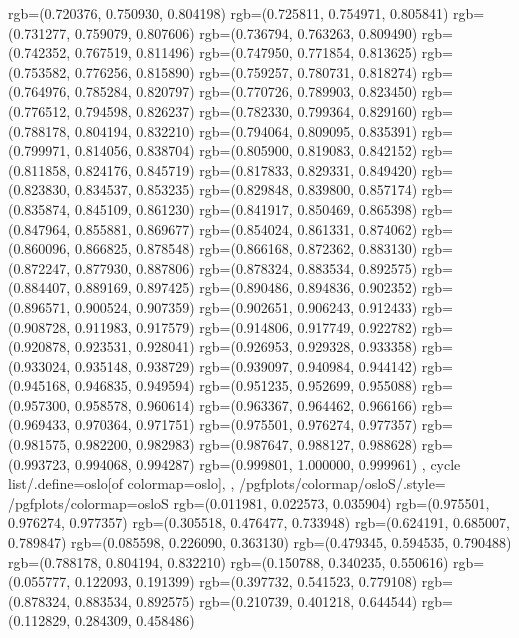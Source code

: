 {{{					rgb=(0.720376, 0.750930, 0.804198)
					rgb=(0.725811, 0.754971, 0.805841)
					rgb=(0.731277, 0.759079, 0.807606)
					rgb=(0.736794, 0.763263, 0.809490)
					rgb=(0.742352, 0.767519, 0.811496)
					rgb=(0.747950, 0.771854, 0.813625)
					rgb=(0.753582, 0.776256, 0.815890)
					rgb=(0.759257, 0.780731, 0.818274)
					rgb=(0.764976, 0.785284, 0.820797)
					rgb=(0.770726, 0.789903, 0.823450)
					rgb=(0.776512, 0.794598, 0.826237)
					rgb=(0.782330, 0.799364, 0.829160)
					rgb=(0.788178, 0.804194, 0.832210)
					rgb=(0.794064, 0.809095, 0.835391)
					rgb=(0.799971, 0.814056, 0.838704)
					rgb=(0.805900, 0.819083, 0.842152)
					rgb=(0.811858, 0.824176, 0.845719)
					rgb=(0.817833, 0.829331, 0.849420)
					rgb=(0.823830, 0.834537, 0.853235)
					rgb=(0.829848, 0.839800, 0.857174)
					rgb=(0.835874, 0.845109, 0.861230)
					rgb=(0.841917, 0.850469, 0.865398)
					rgb=(0.847964, 0.855881, 0.869677)
					rgb=(0.854024, 0.861331, 0.874062)
					rgb=(0.860096, 0.866825, 0.878548)
					rgb=(0.866168, 0.872362, 0.883130)
					rgb=(0.872247, 0.877930, 0.887806)
					rgb=(0.878324, 0.883534, 0.892575)
					rgb=(0.884407, 0.889169, 0.897425)
					rgb=(0.890486, 0.894836, 0.902352)
					rgb=(0.896571, 0.900524, 0.907359)
					rgb=(0.902651, 0.906243, 0.912433)
					rgb=(0.908728, 0.911983, 0.917579)
					rgb=(0.914806, 0.917749, 0.922782)
					rgb=(0.920878, 0.923531, 0.928041)
					rgb=(0.926953, 0.929328, 0.933358)
					rgb=(0.933024, 0.935148, 0.938729)
					rgb=(0.939097, 0.940984, 0.944142)
					rgb=(0.945168, 0.946835, 0.949594)
					rgb=(0.951235, 0.952699, 0.955088)
					rgb=(0.957300, 0.958578, 0.960614)
					rgb=(0.963367, 0.964462, 0.966166)
					rgb=(0.969433, 0.970364, 0.971751)
					rgb=(0.975501, 0.976274, 0.977357)
					rgb=(0.981575, 0.982200, 0.982983)
					rgb=(0.987647, 0.988127, 0.988628)
					rgb=(0.993723, 0.994068, 0.994287)
					rgb=(0.999801, 1.000000, 0.999961)
			},
		cycle list/.define={oslo}{[of colormap=oslo]},
		},
		/pgfplots/colormap/osloS/.style={
			/pgfplots/colormap={osloS}{%
					rgb=(0.011981, 0.022573, 0.035904)
					rgb=(0.975501, 0.976274, 0.977357)
					rgb=(0.305518, 0.476477, 0.733948)
					rgb=(0.624191, 0.685007, 0.789847)
					rgb=(0.085598, 0.226090, 0.363130)
					rgb=(0.479345, 0.594535, 0.790488)
					rgb=(0.788178, 0.804194, 0.832210)
					rgb=(0.150788, 0.340235, 0.550616)
					rgb=(0.055777, 0.122093, 0.191399)
					rgb=(0.397732, 0.541523, 0.779108)
					rgb=(0.878324, 0.883534, 0.892575)
					rgb=(0.210739, 0.401218, 0.644544)
					rgb=(0.112829, 0.284309, 0.458486)
}}}
